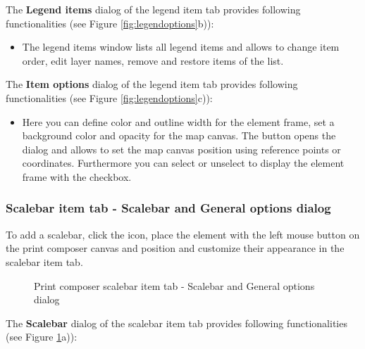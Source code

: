 
The \textbf{Legend items} dialog of the legend item tab provides following
functionalities (see Figure \ref{fig:legendoptions}b)):

\begin{itemize}
\item The legend items window lists all legend items and allows to change
item order, edit layer names, remove and restore items of the list.  
\end{itemize}


The \textbf{Item options} dialog of the legend item tab provides following
functionalities (see Figure \ref{fig:legendoptions}c)):

\begin{itemize}
\item Here you can define color and outline width for the element frame, set
a background color and opacity for the map canvas. The 
button opens the  dialog and allows to set the map
canvas position using reference points or coordinates. Furthermore you can
select or unselect to display the element frame with the  checkbox.
\end{itemize}

\subsubsection{Scalebar item tab - Scalebar and General options dialog}

To add a scalebar, click the 
icon, place the element with the left mouse button on the print composer
canvas and position and customize their appearance in the scalebar item tab.

\begin{figure}[ht]
\centering
\caption{Print composer scalebar item tab - Scalebar and General options dialog \nixcaption}\label{fig:scalebaroptions}
\goodgap
{}
\end{figure}


The \textbf{Scalebar} dialog of the scalebar item tab provides following
functionalities (see Figure \ref{fig:scalebaroptions}a)):

